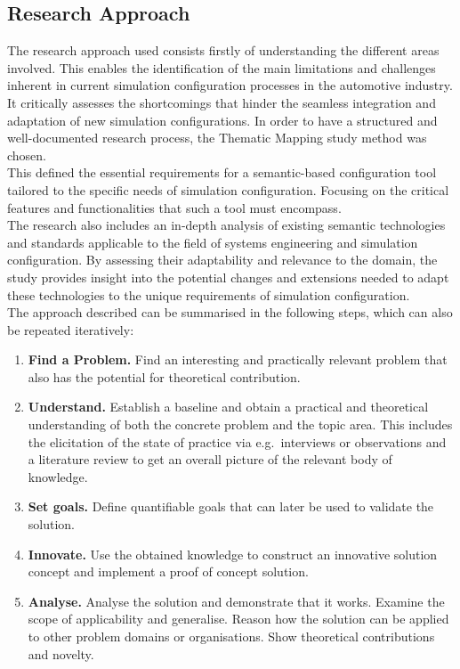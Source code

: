 \clearpage
\subsection{Research Approach}
The research approach used consists firstly of understanding the different areas involved. This enables the identification of the main limitations and challenges inherent in current simulation configuration processes in the automotive industry. It critically assesses the shortcomings that hinder the seamless integration and adaptation of new simulation configurations.
In order to have a structured and well-documented research process, the Thematic Mapping study method was chosen.\\

This defined the essential requirements for a semantic-based configuration tool tailored to the specific needs of simulation configuration. Focusing on the critical features and functionalities that such a tool must encompass.\\

The research also includes an in-depth analysis of existing semantic technologies and standards applicable to the field of systems engineering and simulation configuration. By assessing their adaptability and relevance to the domain, the study provides insight into the potential changes and extensions needed to adapt these technologies to the unique requirements of simulation configuration.\\

The approach described can be summarised in the following steps, which can also be repeated iteratively:

\begin{enumerate}
    \item \textbf{Find a Problem.} Find an interesting and practically relevant problem that also
        has the potential for theoretical contribution.
    \item \textbf{Understand.} Establish a baseline and obtain a practical and theoretical
        understanding of both the concrete problem and the topic area. This includes the
        elicitation of the state of practice via e.g.~interviews or observations and a
        literature review to get an overall picture of the relevant body of knowledge.
    \item \textbf{Set goals.} Define quantifiable goals that can later be used to validate the
        solution.
    \item \textbf{Innovate.} Use the obtained knowledge to construct an innovative solution
        concept and implement a proof of concept solution.
    \item \textbf{Analyse.} Analyse the solution and demonstrate that it works. Examine the scope
        of applicability and generalise. Reason how the solution can be applied to other problem
        domains or organisations. Show theoretical contributions and novelty.
\end{enumerate}


